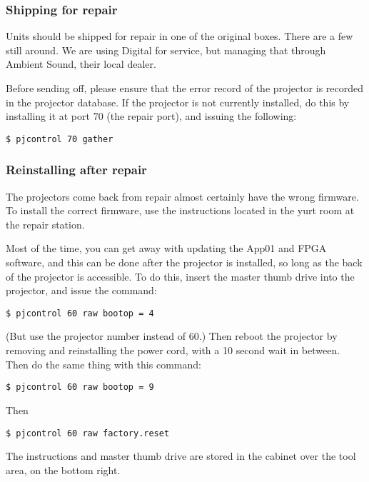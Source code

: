 \documentclass[11pt]{article}
\begin{document}
\subsubsection{Shipping for repair}

Units should be shipped for repair in one of the original boxes. There
are a few still around.  We are using Digital for service, but
managing that through Ambient Sound, their local dealer.

Before sending off, please ensure that the error record of the
projector is recorded in the projector database. If the projector is
not currently installed, do this by installing it at port 70 (the
repair port), and issuing the following:

\begin{verbatim}
$ pjcontrol 70 gather
\end{verbatim}


\subsubsection{Reinstalling after repair}

The projectors come back from repair almost certainly have the wrong
firmware.  To install the correct firmware, use the instructions
located in the yurt room at the repair station.

Most of the time, you can get away with updating the App01 and FPGA
software, and this can be done after the projector is installed, so
long as the back of the projector is accessible.  To do this, insert
the master thumb drive into the projector, and issue the command:

\begin{verbatim}
$ pjcontrol 60 raw bootop = 4
\end{verbatim}

(But use the projector number instead of 60.) Then reboot the
projector by removing and reinstalling the power cord, with a 10
second wait in between.  Then do the same thing with this command:

\begin{verbatim}
$ pjcontrol 60 raw bootop = 9
\end{verbatim}

Then

\begin{verbatim}
$ pjcontrol 60 raw factory.reset
\end{verbatim}

The instructions and master thumb drive are stored in the cabinet over
the tool area, on the bottom right.
\end{document}
